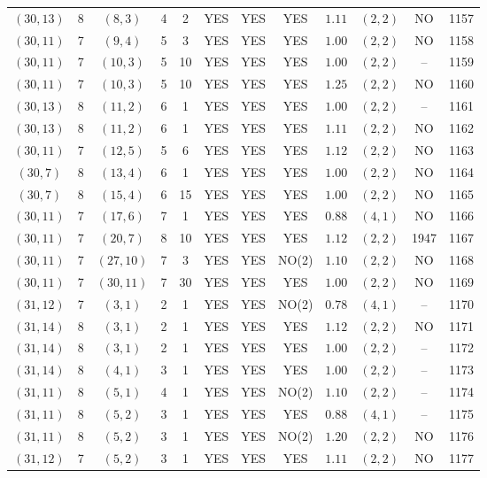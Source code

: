 \begin{longtable}{|c|c|c|c|c|c|c|c|c|c|c|c|}
$(30,13)$ & 8 & $(8,3)$ & 4 & 2 & YES & YES & YES & $1.11$ & $(2,2)$ & NO & 1157\\
$(30,11)$ & 7 & $(9,4)$ & 5 & 3 & YES & YES & YES & $1.00$ & $(2,2)$ & NO & 1158\\
$(30,11)$ & 7 & $(10,3)$ & 5 & 10 & YES & YES & YES & $1.00$ & $(2,2)$ & -- & 1159\\
$(30,11)$ & 7 & $(10,3)$ & 5 & 10 & YES & YES & YES & $1.25$ & $(2,2)$ & NO & 1160\\
$(30,13)$ & 8 & $(11,2)$ & 6 & 1 & YES & YES & YES & $1.00$ & $(2,2)$ & -- & 1161\\
$(30,13)$ & 8 & $(11,2)$ & 6 & 1 & YES & YES & YES & $1.11$ & $(2,2)$ & NO & 1162\\
$(30,11)$ & 7 & $(12,5)$ & 5 & 6 & YES & YES & YES & $1.12$ & $(2,2)$ & NO & 1163\\
$(30,7)$ & 8 & $(13,4)$ & 6 & 1 & YES & YES & YES & $1.00$ & $(2,2)$ & NO & 1164\\
$(30,7)$ & 8 & $(15,4)$ & 6 & 15 & YES & YES & YES & $1.00$ & $(2,2)$ & NO & 1165\\
$(30,11)$ & 7 & $(17,6)$ & 7 & 1 & YES & YES & YES & $0.88$ & $(4,1)$ & NO & 1166\\
$(30,11)$ & 7 & $(20,7)$ & 8 & 10 & YES & YES & YES & $1.12$ & $(2,2)$ & 1947 & 1167\\
$(30,11)$ & 7 & $(27,10)$ & 7 & 3 & YES & YES & NO(2) & $1.10$ & $(2,2)$ & NO & 1168\\
$(30,11)$ & 7 & $(30,11)$ & 7 & 30 & YES & YES & YES & $1.00$ & $(2,2)$ & NO & 1169\\
$(31,12)$ & 7 & $(3,1)$ & 2 & 1 & YES & YES & NO(2) & $0.78$ & $(4,1)$ & -- & 1170\\
$(31,14)$ & 8 & $(3,1)$ & 2 & 1 & YES & YES & YES & $1.12$ & $(2,2)$ & NO & 1171\\
$(31,14)$ & 8 & $(3,1)$ & 2 & 1 & YES & YES & YES & $1.00$ & $(2,2)$ & -- & 1172\\
$(31,14)$ & 8 & $(4,1)$ & 3 & 1 & YES & YES & YES & $1.00$ & $(2,2)$ & -- & 1173\\
$(31,11)$ & 8 & $(5,1)$ & 4 & 1 & YES & YES & NO(2) & $1.10$ & $(2,2)$ & -- & 1174\\
$(31,11)$ & 8 & $(5,2)$ & 3 & 1 & YES & YES & YES & $0.88$ & $(4,1)$ & -- & 1175\\
$(31,11)$ & 8 & $(5,2)$ & 3 & 1 & YES & YES & NO(2) & $1.20$ & $(2,2)$ & NO & 1176\\
$(31,12)$ & 7 & $(5,2)$ & 3 & 1 & YES & YES & YES & $1.11$ & $(2,2)$ & NO & 1177\\

\end{longtable}
